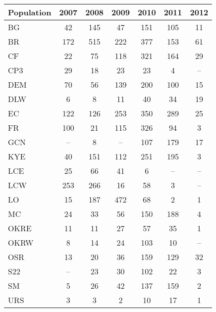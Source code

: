 \documentclass[varwidth=\maxdimen,border=1pt]{standalone}
\begin{document}
  
\begin{tabular}{lcccccc}
  \hline
Population & 2007 & 2008 & 2009 & 2010 & 2011 & 2012 \\ 
  \hline
BG &  42 & 145 &  47 & 151 & 105 &  11 \\ 
  BR & 172 & 515 & 222 & 377 & 153 &  61 \\ 
  CF &  22 &  75 & 118 & 321 & 164 &  29 \\ 
  CP3 &  29 &  18 &  23 &  23 &   4 & -- \\ 
  DEM &  70 &  56 & 139 & 200 & 100 &  15 \\ 
  DLW &   6 &   8 &  11 &  40 &  34 &  19 \\ 
  EC & 122 & 126 & 253 & 350 & 289 &  25 \\ 
  FR & 100 &  21 & 115 & 326 &  94 &   3 \\ 
  GCN & -- &   8 & -- & 107 & 179 &  17 \\ 
  KYE &  40 & 151 & 112 & 251 & 195 &   3 \\ 
  LCE &  25 &  66 &  41 &   6 & -- & -- \\ 
  LCW & 253 & 266 &  16 &  58 &   3 & -- \\ 
  LO &  15 & 187 & 472 &  68 &   2 &   1 \\ 
  MC &  24 &  33 &  56 & 150 & 188 &   4 \\ 
  OKRE &  11 &  11 &  27 &  57 &  35 &   1 \\ 
  OKRW &   8 &  14 &  24 & 103 &  10 & -- \\ 
  OSR &  13 &  20 &  36 & 159 & 129 &  32 \\ 
  S22 & -- &  23 &  30 & 102 &  22 &   3 \\ 
  SM &   5 &  26 &  42 & 137 & 159 &   2 \\ 
  URS &   3 &   3 &   2 &  10 &  17 &   1 \\ 
   \hline
\end{tabular}



 
\end{document}
